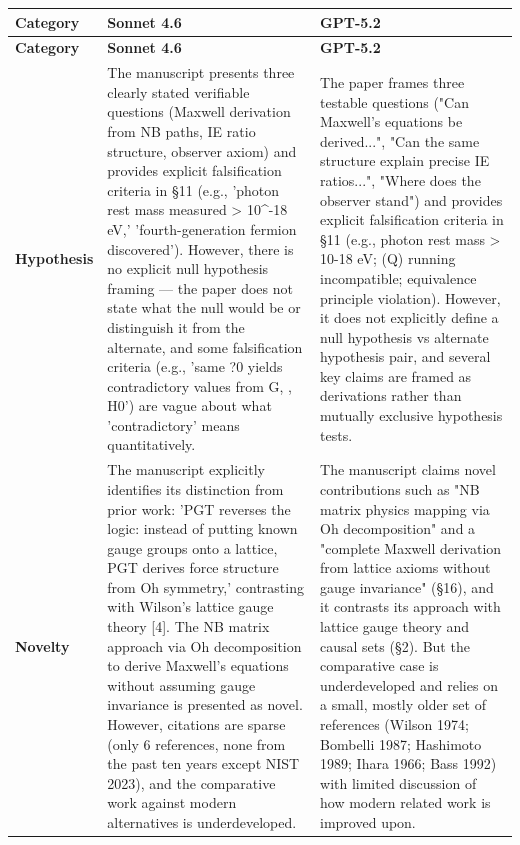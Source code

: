 \documentclass[11pt]{article}
\begin{document}
\begin{longtable}{@{} p{2.2cm} p{6.3cm} p{6.3cm} @{}}
\toprule
\textbf{Category} & \textbf{Sonnet 4.6} & \textbf{GPT-5.2} \\
\midrule
\endfirsthead
\toprule
\textbf{Category} & \textbf{Sonnet 4.6} & \textbf{GPT-5.2} \\
\midrule
\endhead
\bottomrule
\endlastfoot

\rowcolor{rowgray}
\textbf{Hypothesis} &
The manuscript presents three clearly stated verifiable questions (Maxwell derivation from NB paths, IE ratio structure, observer axiom) and provides explicit falsification criteria in \S{}11 (e.g., 'photon rest mass measured > 10\textasciicircum{}-18 eV,' 'fourth-generation fermion discovered'). However, there is no explicit null hypothesis framing --- the paper does not state what the null would be or distinguish it from the alternate, and some falsification criteria (e.g., 'same ?0 yields contradictory values from G, \textsigma{}, H0') are vague about what 'contradictory' means quantitatively. &
The paper frames three testable questions ("Can Maxwell's equations be derived...", "Can the same structure explain precise IE ratios...", "Where does the observer stand") and provides explicit falsification criteria in \S{}11 (e.g., photon rest mass > 10-18 eV; \textalpha{}(Q) running incompatible; equivalence principle violation). However, it does not explicitly define a null hypothesis vs alternate hypothesis pair, and several key claims are framed as derivations rather than mutually exclusive hypothesis tests. \\[6pt]

\textbf{Novelty} &
The manuscript explicitly identifies its distinction from prior work: 'PGT reverses the logic: instead of putting known gauge groups onto a lattice, PGT derives force structure from Oh symmetry,' contrasting with Wilson's lattice gauge theory [4]. The NB matrix approach via Oh decomposition to derive Maxwell's equations without assuming gauge invariance is presented as novel. However, citations are sparse (only 6 references, none from the past ten years except NIST 2023), and the comparative work against modern alternatives is underdeveloped. &
The manuscript claims novel contributions such as "NB matrix \textrightarrow{} physics mapping via Oh decomposition" and a "complete Maxwell derivation from lattice axioms without gauge invariance" (\S{}16), and it contrasts its approach with lattice gauge theory and causal sets (\S{}2). But the comparative case is underdeveloped and relies on a small, mostly older set of references (Wilson 1974; Bombelli 1987; Hashimoto 1989; Ihara 1966; Bass 1992) with limited discussion of how modern related work is improved upon. \\[6pt]


\end{longtable}
\end{document}
